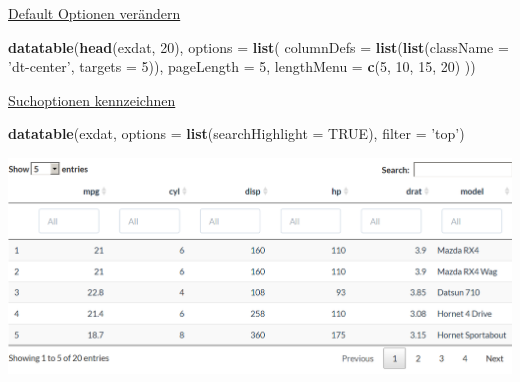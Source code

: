 \documentclass[ignorenonframetext,]{beamer}
\newenvironment{Shaded}{}{}
\newcommand{\KeywordTok}[1]{\textcolor[rgb]{0.00,0.44,0.13}{\textbf{{#1}}}}
\newcommand{\DataTypeTok}[1]{\textcolor[rgb]{0.56,0.13,0.00}{{#1}}}
\newcommand{\DecValTok}[1]{\textcolor[rgb]{0.25,0.63,0.44}{{#1}}}
\newcommand{\StringTok}[1]{\textcolor[rgb]{0.25,0.44,0.63}{{#1}}}
\newcommand{\OtherTok}[1]{\textcolor[rgb]{0.00,0.44,0.13}{{#1}}}
\newcommand{\NormalTok}[1]{{#1}}
\begin{document}
\begin{frame}[fragile]{\href{http://rstudio.github.io/DT/options.html}{Default
Optionen verändern}}

\begin{Shaded}
\begin{Highlighting}[]
\KeywordTok{datatable}\NormalTok{(}\KeywordTok{head}\NormalTok{(exdat, }\DecValTok{20}\NormalTok{), }\DataTypeTok{options =} \KeywordTok{list}\NormalTok{(}
  \DataTypeTok{columnDefs =} \KeywordTok{list}\NormalTok{(}\KeywordTok{list}\NormalTok{(}\DataTypeTok{className =} \StringTok{'dt-center'}\NormalTok{, }\DataTypeTok{targets =} \DecValTok{5}\NormalTok{)),}
  \DataTypeTok{pageLength =} \DecValTok{5}\NormalTok{,}
  \DataTypeTok{lengthMenu =} \KeywordTok{c}\NormalTok{(}\DecValTok{5}\NormalTok{, }\DecValTok{10}\NormalTok{, }\DecValTok{15}\NormalTok{, }\DecValTok{20}\NormalTok{)}
\NormalTok{))}
\end{Highlighting}
\end{Shaded}

\end{frame}

\begin{frame}[fragile]{\href{http://rstudio.github.io/DT/006-highlight.html}{Suchoptionen
kennzeichnen}}

\begin{Shaded}
\begin{Highlighting}[]
\KeywordTok{datatable}\NormalTok{(exdat, }\DataTypeTok{options =} \KeywordTok{list}\NormalTok{(}\DataTypeTok{searchHighlight =} \OtherTok{TRUE}\NormalTok{), }
          \DataTypeTok{filter =} \StringTok{'top'}\NormalTok{)}
\end{Highlighting}
\end{Shaded}

\includegraphics{./tex2pdf.956/cc602f47359ab693f11f94fcacceaf5d56c238d9.png}

\end{frame}
\end{document}
